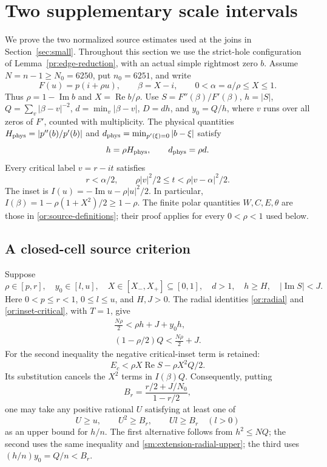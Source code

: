 \documentclass[11pt,reqno]{amsart}
\numberwithin{equation}{section}
\theoremstyle{definition}
\theoremstyle{remark}
\renewcommand{\Re}{\operatorname{Re}}
\renewcommand{\Im}{\operatorname{Im}}
\begin{document}
\section{Two supplementary scale intervals}\label{sec:small-extensions}

We prove the two normalized source estimates used at the joins in
Section~\ref{sec:small}. Throughout this section we use the strict-hole
configuration of Lemma~\ref{pr:edge-reduction}, with an actual simple
rightmost zero $b$. Assume $N=n-1\ge N_0=6250$, put $n_0=6251$,
and write
\[
 F(u)=p(i+\rho u),\qquad \beta=X-i,\qquad
 0<\alpha=a/\rho\le X\le1.
\]
Thus $\rho=1-\Im b$ and $X=\Re b/\rho$. Use
$S=F''(\beta)/F'(\beta)$, $h=|S|$, $Q=\sum_v|\beta-v|^{-2}$,
$d=\min_v|\beta-v|$, $D=dh$, and $y_0=Q/h$, where $v$ runs over
all zeros of $F'$, counted with multiplicity.
The physical quantities $H_{\rm phys}=|p''(b)/p'(b)|$ and
$d_{\rm phys}=\min_{p'(\xi)=0}|b-\xi|$ satisfy
\[
 h=\rho H_{\rm phys},\qquad d_{\rm phys}=\rho d.
\]
Every critical label $v=r-it$ satisfies
\begin{equation}\label{sm:extension-domain}
 r<\alpha/2,\qquad \rho|v|^2/2\le t<\rho|v-\alpha|^2/2.
\end{equation}
The inset is $I(u)=-\Im u-\rho|u|^2/2$. In particular,
$I(\beta)=1-\rho(1+X^2)/2\ge1-\rho$.
The finite polar quantities $W,C,E,\theta$ are those in
\eqref{or:source-definitions}; their proof applies for every
$0<\rho<1$ used below.

\subsection{A closed-cell source criterion}

Suppose
\[
 \rho\in[p,r],\quad y_0\in[l,u],\quad
 X\in[X_-,X_+]\subseteq[0,1],\quad d>1,\quad
 h\ge H,\quad |\Im S|<J.
\]
Here $0<p\le r<1$, $0\le l\le u$, and $H,J>0$.
The radial identities \eqref{or:radial} and
\eqref{or:inset-critical}, with $T=1$, give
\begin{gather}
 \frac{N\rho}{2}<\rho h+J+y_0h,\label{sm:extension-radial-lower}\\
 (1-\rho/2)Q<\frac{N\rho}{2}+J.\label{sm:extension-radial-upper}
\end{gather}
For the second inequality the negative critical-inset term is retained:
\[
 E_c<\rho X\Re S-\rho X^2Q/2.
\]
Its substitution cancels the $X^2$ terms in $I(\beta)Q$.
Consequently, putting
\[
 B_r=\frac{r/2+J/N_0}{1-r/2},
\]
one may take any positive rational $U$ satisfying at least one of
\begin{equation}\label{sm:extension-U}
 U\ge u,\qquad U^2\ge B_r,\qquad Ul\ge B_r\quad(l>0)
\end{equation}
as an upper bound for $h/n$. The first alternative follows from
$h^2\le NQ$; the second uses the same inequality and
\eqref{sm:extension-radial-upper}; the third uses
$(h/n)y_0=Q/n<B_r$.
\end{document}
